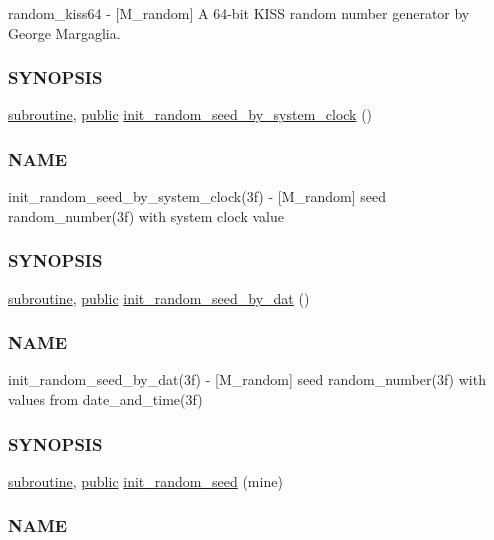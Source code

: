\begin{DoxyCompactItemize}
\begin{DoxyCompactList}
random\+\_\+kiss64 -\/ \mbox{[}M\+\_\+random\mbox{]} A 64-\/bit K\+I\+SS random number generator by George Margaglia. \subsubsection*{S\+Y\+N\+O\+P\+S\+IS}\end{DoxyCompactList}\item 
\hyperlink{M__stopwatch_83_8txt_acfbcff50169d691ff02d4a123ed70482}{subroutine}, \hyperlink{M__stopwatch_83_8txt_a2f74811300c361e53b430611a7d1769f}{public} \hyperlink{namespacem__random_a887216bea7a75b314e538afd3ebe2ff3}{init\+\_\+random\+\_\+seed\+\_\+by\+\_\+system\+\_\+clock} ()
\begin{DoxyCompactList}\small\item\em \subsubsection*{N\+A\+ME}

init\+\_\+random\+\_\+seed\+\_\+by\+\_\+system\+\_\+clock(3f) -\/ \mbox{[}M\+\_\+random\mbox{]} seed random\+\_\+number(3f) with system clock value \subsubsection*{S\+Y\+N\+O\+P\+S\+IS}\end{DoxyCompactList}\item 
\hyperlink{M__stopwatch_83_8txt_acfbcff50169d691ff02d4a123ed70482}{subroutine}, \hyperlink{M__stopwatch_83_8txt_a2f74811300c361e53b430611a7d1769f}{public} \hyperlink{namespacem__random_a6e3975f994c77778043f3e5d00614317}{init\+\_\+random\+\_\+seed\+\_\+by\+\_\+dat} ()
\begin{DoxyCompactList}\small\item\em \subsubsection*{N\+A\+ME}

init\+\_\+random\+\_\+seed\+\_\+by\+\_\+dat(3f) -\/ \mbox{[}M\+\_\+random\mbox{]} seed random\+\_\+number(3f) with values from date\+\_\+and\+\_\+time(3f) \subsubsection*{S\+Y\+N\+O\+P\+S\+IS}\end{DoxyCompactList}\item 
\hyperlink{M__stopwatch_83_8txt_acfbcff50169d691ff02d4a123ed70482}{subroutine}, \hyperlink{M__stopwatch_83_8txt_a2f74811300c361e53b430611a7d1769f}{public} \hyperlink{namespacem__random_af867f4abf9b4006b89e0ca160fc1b61a}{init\+\_\+random\+\_\+seed} (mine)
\begin{DoxyCompactList}\small\item\em \subsubsection*{N\+A\+ME}


\end{DoxyCompactList}
\end{DoxyCompactItemize}
